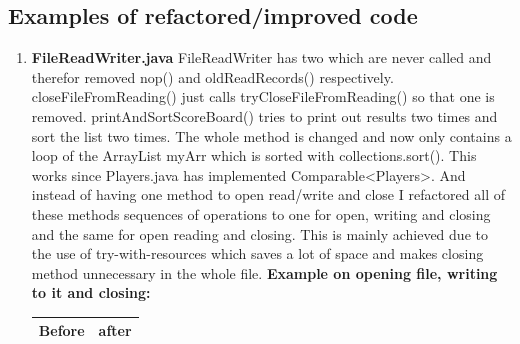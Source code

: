 \documentclass{article}
\begin{document}
\subsection{Examples of refactored/improved code}
\begin{enumerate}
\item
\textbf{FileReadWriter.java}
FileReadWriter has two which are never called and therefor removed nop() and oldReadRecords()
respectively.
closeFileFromReading() just calls tryCloseFileFromReading() so that one is removed.
printAndSortScoreBoard() tries to print out results two times and sort the list two times.
The whole method is changed and now only contains a loop of the ArrayList myArr which is sorted
with collections.sort(). This works since Players.java has implemented Comparable<Players>.
And instead of having one method to open read/write and close I refactored all of these methods
sequences of operations to one for open, writing and closing and the same for open reading and closing. This is mainly achieved due to the use of try-with-resources which saves a lot of space and
makes closing method unnecessary in the whole file. 
\textbf{Example on opening file, writing to it and closing:\newline}
\hspace*{-2.0cm}\begin{tabulary}{0.5\textwidth}{| c | c |}
 \hline
 Before & after \\ \hline

\end{tabulary}
\end{enumerate}
\end{document}
